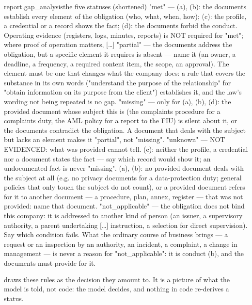 \begin{promptexcerpt}{report.gap_analysis}{the five statuses (shortened)}
    "met" — (a), (b): the documents establish every element of the obligation (who,
      what, when, how); (c): the profile, a credential or a record shows the fact;
      (d): the documents forbid the conduct. Operating evidence (registers, logs,
      minutes, reports) is NOT required for "met"; where proof of operation matters,
[…]
    "partial" — the documents address the obligation, but a specific element it
      requires is absent — name it (an owner, a deadline, a frequency, a required
      content item, the scope, an approval). The element must be one that changes
      what the company does: a rule that covers the substance in its own words
      ("understand the purpose of the relationship" for "obtain information on its
      purpose from the client") establishes it, and the law's wording not being
      repeated is no gap.
    "missing" — only for (a), (b), (d): the provided document whose subject this is
      (the complaints procedure for a complaints duty, the AML policy for a report to
      the FIU) is silent about it, or the documents contradict the obligation. A
      document that deals with the subject but lacks an element makes it "partial",
      not "missing".
    "unknown" — NOT EVIDENCED: what was provided cannot tell. (c): neither the
      profile, a credential nor a document states the fact — say which record would
      show it; an undocumented fact is never "missing". (a), (b): no provided document
      deals with the subject at all (e.g. no privacy documents for a data-protection
      duty; general policies that only touch the subject do not count), or a provided
      document refers for it to another document — a procedure, plan, annex, register
      — that was not provided: name that document.
    "not_applicable" — the obligation does not bind this company: it is addressed to
      another kind of person (an issuer, a supervisory authority, a parent undertaking
[…]
      instruction, a selection for direct supervision). Say which condition fails.
      What the ordinary course
      of business brings — a request or an inspection by an authority, an incident, a
      complaint, a change in management — is never a reason for "not_applicable": it
      is conduct (b), and the documents must provide for it.
\end{promptexcerpt}

 draws these rules as the decision they amount to. It is a picture of
what the model is told, not code: the model decides, and nothing in code re-derives a status.

